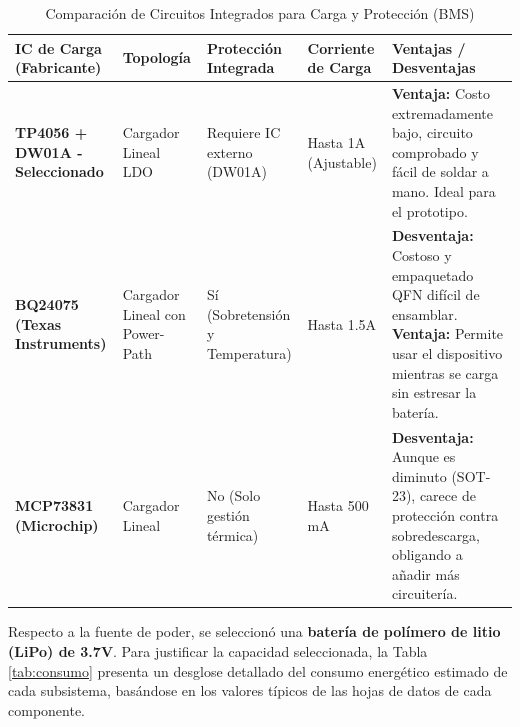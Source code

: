 \documentclass[letterpaper,11pt]{article}
\newcommand{\rtabla}[1]{Tabla \ref{#1}}
\begin{document}
\begin{table}[H]
    \centering
    \renewcommand{\arraystretch}{1.3}
    \begin{tabular}{|L{2.5cm}|L{2.5cm}|L{2.5cm}|L{2.0cm}|L{3.5cm}|}
        \hline
        \textbf{IC de Carga (Fabricante)}                        & \textbf{Topología}             & \textbf{Protección Integrada}   & \textbf{Corriente de Carga} & \textbf{Ventajas / Desventajas}                                                                                                                               \\ \hline
        \textbf{TP4056 + DW01A - Seleccionado} \citep{tp4056_ds} & Cargador Lineal LDO            & Requiere IC externo (DW01A)     & Hasta 1A (Ajustable)        & \textbf{Ventaja:} Costo extremadamente bajo, circuito comprobado y fácil de soldar a mano. Ideal para el prototipo.                                           \\ \hline
        \textbf{BQ24075 (Texas Instruments)} \citep{bq24075_ds}  & Cargador Lineal con Power-Path & Sí (Sobretensión y Temperatura) & Hasta 1.5A                  & \textbf{Desventaja:} Costoso y empaquetado QFN difícil de ensamblar. \textbf{Ventaja:} Permite usar el dispositivo mientras se carga sin estresar la batería. \\ \hline
        \textbf{MCP73831 (Microchip)} \citep{mcp73831_ds}        & Cargador Lineal                & No (Solo gestión térmica)       & Hasta 500 mA                & \textbf{Desventaja:} Aunque es diminuto (SOT-23), carece de protección contra sobredescarga, obligando a añadir más circuitería.                              \\ \hline
    \end{tabular}
    \caption{Comparación de Circuitos Integrados para Carga y Protección (BMS)}
    \label{tab:bms_comparison}
\end{table}

Respecto a la fuente de poder, se seleccionó una \textbf{batería de polímero de litio (LiPo) de 3.7V}. Para justificar la capacidad seleccionada, la \rtabla{tab:consumo} presenta un desglose detallado del consumo energético estimado de cada subsistema, basándose en los valores típicos de las hojas de datos de cada componente.
\end{document}
